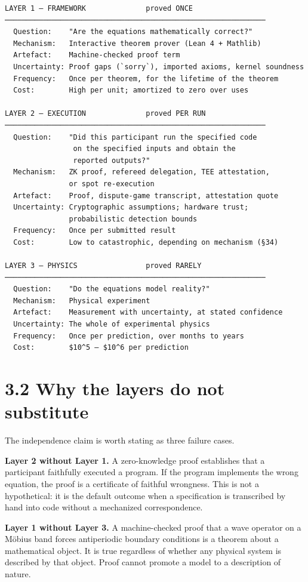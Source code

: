 \documentclass[
  11pt]{report}
\begin{document}
\begin{verbatim}
LAYER 1 — FRAMEWORK              proved ONCE
─────────────────────────────────────────────────────────────
  Question:    "Are the equations mathematically correct?"
  Mechanism:   Interactive theorem prover (Lean 4 + Mathlib)
  Artefact:    Machine-checked proof term
  Uncertainty: Proof gaps (`sorry`), imported axioms, kernel soundness
  Frequency:   Once per theorem, for the lifetime of the theorem
  Cost:        High per unit; amortized to zero over uses

LAYER 2 — EXECUTION              proved PER RUN
─────────────────────────────────────────────────────────────
  Question:    "Did this participant run the specified code
                on the specified inputs and obtain the
                reported outputs?"
  Mechanism:   ZK proof, refereed delegation, TEE attestation,
               or spot re-execution
  Artefact:    Proof, dispute-game transcript, attestation quote
  Uncertainty: Cryptographic assumptions; hardware trust;
               probabilistic detection bounds
  Frequency:   Once per submitted result
  Cost:        Low to catastrophic, depending on mechanism (§34)

LAYER 3 — PHYSICS                proved RARELY
─────────────────────────────────────────────────────────────
  Question:    "Do the equations model reality?"
  Mechanism:   Physical experiment
  Artefact:    Measurement with uncertainty, at stated confidence
  Uncertainty: The whole of experimental physics
  Frequency:   Once per prediction, over months to years
  Cost:        $10^5 – $10^6 per prediction
\end{verbatim}

\hypertarget{why-the-layers-do-not-substitute}{%
\section{3.2 Why the layers do not
substitute}\label{why-the-layers-do-not-substitute}}

The independence claim is worth stating as three failure cases.

\textbf{Layer 2 without Layer 1.} A zero-knowledge proof establishes
that a participant faithfully executed a program. If the program
implements the wrong equation, the proof is a certificate of faithful
wrongness. This is not a hypothetical: it is the default outcome when a
specification is transcribed by hand into code without a mechanized
correspondence.

\textbf{Layer 1 without Layer 3.} A machine-checked proof that a wave
operator on a Möbius band forces antiperiodic boundary conditions is a
theorem about a mathematical object. It is true regardless of whether
any physical system is described by that object. Proof cannot promote a
model to a description of nature.
\end{document}
